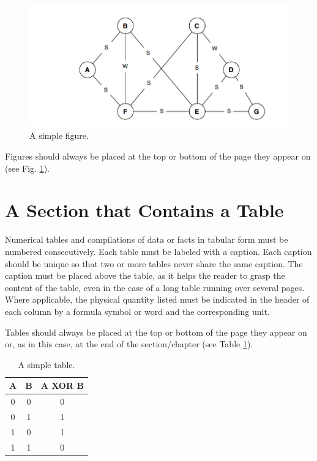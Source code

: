 \begin{figure}[t]
\includegraphics[width=15cm]{figures/figure1.png}
\caption{A simple figure.}
\label{fig:graph}
\end{figure}

Figures should always be placed at the top or bottom of the page they appear on (see Fig. \ref{fig:graph}).

\section{A Section that Contains a Table}

Numerical tables and compilations of data or facts in tabular form must be numbered consecutively. Each table must be labeled with a caption. Each caption should be unique so that two or more tables never share the same caption. The caption must be placed above the table, as it helps the reader to grasp the content of the table, even in the case of a long table running over several pages. Where applicable, the physical quantity listed must be indicated in the header of each column by a formula symbol or word and the corresponding unit.

Tables should always be placed at the top or bottom of the page they appear on or, as in this case, at the end of the section/chapter (see Table \ref{tab:xor}).

\begin{table}[ht!]
\center
\caption{A simple table.}
\begin{tabular}{cc|c}
A & B & A XOR B\\
\hline
0 & 0 & 0\\
0 & 1 & 1\\
1 & 0 & 1\\
1 & 1 & 0\\
\end{tabular}
\label{tab:xor}
\end{table}